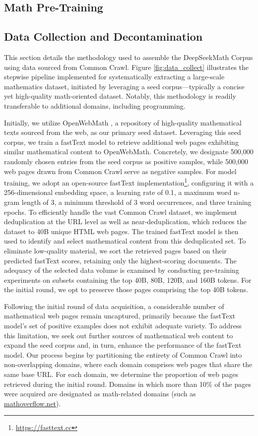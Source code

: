 \begin{itemize}[topsep=0pt]
\section{Math Pre-Training}

\subsection{Data Collection and Decontamination} This section details the methodology used to assemble the DeepSeekMath Corpus using data sourced from Common Crawl. Figure \ref{fig:data_collect} illustrates the stepwise pipeline implemented for systematically extracting a large-scale mathematics dataset, initiated by leveraging a seed corpus—typically a concise yet high-quality math-oriented dataset. Notably, this methodology is readily transferable to additional domains, including programming.

Initially, we utilize OpenWebMath \citep{openwebmath}, a repository of high-quality mathematical texts sourced from the web, as our primary seed dataset. Leveraging this seed corpus, we train a fastText model \citep{joulin2016fasttext} to retrieve additional web pages exhibiting similar mathematical content to OpenWebMath. Concretely, we designate 500,000 randomly chosen entries from the seed corpus as positive samples, while 500,000 web pages drawn from Common Crawl serve as negative samples. For model training, we adopt an open-source fastText implementation\footnote{\url{https://fasttext.cc}}, configuring it with a 256-dimensional embedding space, a learning rate of 0.1, a maximum word n-gram length of 3, a minimum threshold of 3 word occurrences, and three training epochs. To efficiently handle the vast Common Crawl dataset, we implement deduplication at the URL level as well as near-deduplication, which reduces the dataset to 40B unique HTML web pages. The trained fastText model is then used to identify and select mathematical content from this deduplicated set. To eliminate low-quality material, we sort the retrieved pages based on their predicted fastText scores, retaining only the highest-scoring documents. The adequacy of the selected data volume is examined by conducting pre-training experiments on subsets containing the top 40B, 80B, 120B, and 160B tokens. For the initial round, we opt to preserve those pages comprising the top 40B tokens.

Following the initial round of data acquisition, a considerable number of mathematical web pages remain uncaptured, primarily because the fastText model's set of positive examples does not exhibit adequate variety. To address this limitation, we seek out further sources of mathematical web content to expand the seed corpus and, in turn, enhance the performance of the fastText model. Our process begins by partitioning the entirety of Common Crawl into non-overlapping domains, where each domain comprises web pages that share the same base URL. For each domain, we determine the proportion of web pages retrieved during the initial round. Domains in which more than 10\% of the pages were acquired are designated as math-related domains (such as \url{mathoverflow.net}).


\end{itemize}
